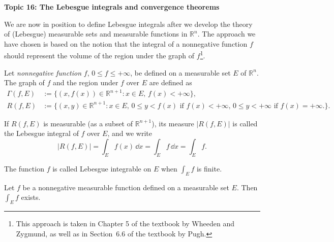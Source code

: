 \documentclass[11pt]{article}
\begin{document}
\begin{center}
  \textbf{Topic 16: The Lebesgue integrals and convergence theorems}
\end{center}

We are now in position to define Lebesgue integrals after we develop the theory of (Lebesgue) measurable sets and measurable functions in $\mathbb{R}^n$.  The approach we have chosen is based on the notion that the integral of a nonnegative function $f$ should represent the volume of the region under the graph of $f$\footnote{This approach is taken in Chapter 5 of the textbook by Wheeden and Zygmund, as well as in Section~6.6 of the textbook by Pugh.}.

\begin{defn}
  Let \textit{nonnegative function} $f$, $0 \leqslant f \leqslant +\infty$, be defined on a measurable set $E$ of $\mathbb{R}^n$.  The \textsf{graph} of $f$ and the \textsf{region} under $f$ over $E$ are defined as
  \begin{align*}
    \Gamma(f,E) &:= \{ (x, f(x)) \in \mathbb{R}^{n+1} \colon x \in E, \, f(x) < +\infty \}, \\
    R(f,E) &:= \{ (x,y) \in \mathbb{R}^{n+1} \colon x \in E, \, 0 \leqslant y < f(x) \text{ if $f(x) < +\infty$, } 0 \leqslant y < +\infty \text{ if $f(x) = +\infty$.} \}.
  \end{align*}

  If $R(f,E)$ is measurable (as a subset of $\mathbb{R}^{n+1}$), its measure $|R(f,E)|$ is called the \textsf{Lebesgue integral} of $f$ over $E$, and we write
  \[
    |R(f,E)| = \int_E f(x) \, \dd x = \int_E f \, \dd x = \int_E f.
  \]

  The function $f$ is called \textsf{Lebesgue integrable} on $E$ when $\int_E f$ is finite.
\end{defn}

\begin{thm}
  \label{thm:lebesgue-integral}
  Let $f$ be a nonnegative measurable function defined on a measurable set $E$.  Then $\int_E f$ exists.
\end{thm}
\end{document}
